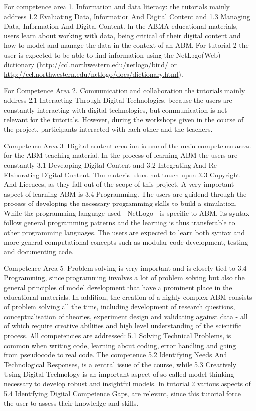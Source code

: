 \documentclass[
]{article}
\begin{document}
For competence area 1. Information and data literacy: the tutorials mainly address 1.2 Evaluating Data, Information And Digital Content and 1.3 Managing Data, Information And Digital Content. In the ABMA educational materials, users learn about working with data, being critical of their digital content and how to model and manage the data in the context of an ABM. For tutorial 2 the user is expected to be able to find information using the NetLogo(Web) dictionary (\url{http://ccl.northwestern.edu/netlogo/bind/} or \url{http://ccl.northwestern.edu/netlogo/docs/dictionary.html}).

For Competence Area 2. Communication and collaboration the tutorials mainly address 2.1 Interacting Through Digital Technologies, because the users are constantly interacting with digital technologies, but communication is not relevant for the tutorials. However, during the workshops given in the course of the project, participants interacted with each other and the teachers.

Competence Area 3. Digital content creation is one of the main competence areas for the ABM-teaching material. In the process of learning ABM the users are constantly 3.1 Developing Digital Content and 3.2 Integrating And Re-Elaborating Digital Content. The material does not touch upon 3.3 Copyright And Licences, as they fall out of the scope of this project. A very important aspect of learning ABM is 3.4 Programming. The users are guidend through the process of developing the necessary programming skills to build a simulation. While the programming language used - NetLogo - is specific to ABM, its syntax follow general programming patterns and the learning is thus transferable to other programming languages. The users are expected to learn both syntax and more general computational concepts such as modular code development, testing and documenting code.

Competence Area 5. Problem solving is very important and is closely tied to 3.4 Programming, since programming involves a lot of problem solving but also the general principles of model development that have a prominent place in the educational materials. In addition, the creation of a highly complex ABM consists of problem solving all the time, including development of research questions, conceptualisation of theories, experiment design and validating against data - all of which require creative abilities and high level understanding of the scientific process. All competencies are addressed: 5.1 Solving Technical Problems, is common when writing code, learning about coding, error handling and going from pseudocode to real code. The competence 5.2 Identifying Needs And Technological Responses, is a central issue of the course, while 5.3 Creatively Using Digital Technology is an important aspect of so-called model thinking necessary to develop robust and insightful models. In tutorial 2 various aspects of 5.4 Identifying Digital Competence Gaps, are relevant, since this tutorial force the user to assess their knowledge and skills.
\end{document}
